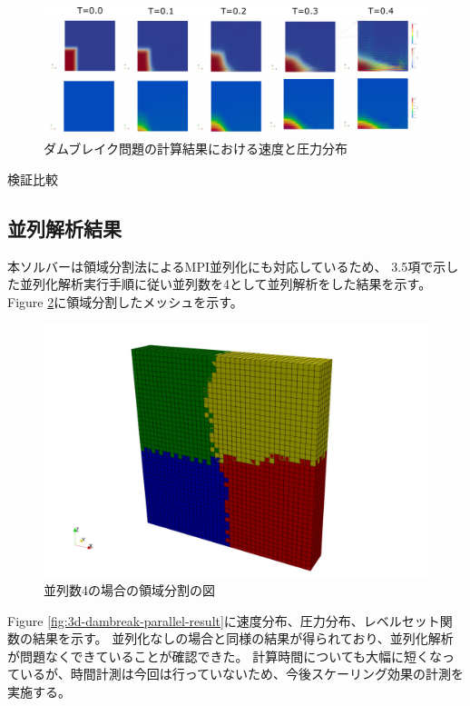 \begin{figure}[H]
	\centering
	\includegraphics[width=18truecm]{pics/3d-dambreak/levelset_velocity.pdf}
	\caption{ダムブレイク問題の計算結果における速度と圧力分布}
	\label{fig:3d-dambreak-result}
\end{figure}

検証比較\cite{Martin1952}

\subsection{並列解析結果}
本ソルバーは領域分割法によるMPI並列化にも対応しているため、
3.5項で示した並列化解析実行手順に従い並列数を4として並列解析をした結果を示す。
Figure \ref{fig:3d-dambreak-parallel-partition}に領域分割したメッシュを示す。

\begin{figure}[H]
	\centering
	\includegraphics[width=18truecm]{pics/3d-dambreak-parallel/partition4.pdf}
	\caption{並列数4の場合の領域分割の図}
	\label{fig:3d-dambreak-parallel-partition}
\end{figure}

Figure \ref{fig:3d-dambreak-parallel-result}に速度分布、圧力分布、レベルセット関数の結果を示す。
並列化なしの場合と同様の結果が得られており、並列化解析が問題なくできていることが確認できた。
計算時間についても大幅に短くなっているが、時間計測は今回は行っていないため、今後スケーリング効果の計測を実施する。

